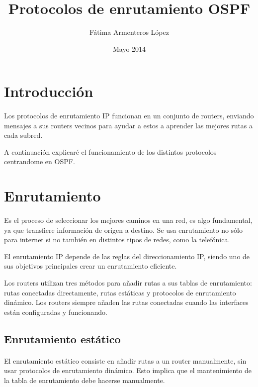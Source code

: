 \documentclass[a4paper,11pt]{article}
\title{Protocolos de enrutamiento OSPF}
\author{Fátima Armenteros López}
\date{Mayo 2014}
\begin{document}
\maketitle
\thispagestyle{empty}
\titlepage
\tableofcontents

\newpage
\section{Introducción}\label{sec:intro}
\paragraph{  }
  Los protocolos de enrutamiento IP funcionan en un conjunto de routers, enviando mensajes a sus routers vecinos para ayudar a estos a aprender las mejores rutas a cada subred. 
  
  A continuación explicaré el funcionamiento de los distintos protocolos centrandome en OSPF.


\section{Enrutamiento}\label{sec:en}
\paragraph{  }
Es el proceso de seleccionar los mejores caminos en una red, es algo fundamental, ya que transfiere información de origen a destino. Se usa enrutamiento no sólo para internet si no también en distintos tipos de redes, como la telefónica.

El enrutamiento IP depende de las reglas del direccionamiento IP, siendo uno de sus objetivos principales crear un enrutamiento eficiente.

Los routers utilizan tres métodos para añadir rutas a sus tablas de enrutamiento: rutas conectadas directamente, rutas estáticas y protocolos de enrutamiento dinámico. Los routers siempre añaden las rutas conectadas cuando las interfaces están configuradas y funcionando.  

\subsection{Enrutamiento estático}\label{subsec:enestatico}
\paragraph{  }
El enrutamiento estático consiste en añadir rutas a un router manualmente, sin usar protocolos de enrutamiento dinámico. Esto implica que el mantenimiento de la tabla de enrutamiento debe hacerse manualmente.
\end{document}
